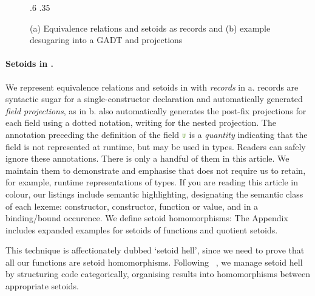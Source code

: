 \begin{figure}
\TwoColDIY%
    {.6}{\EquivalenceDef{}
          \SetoidDef{}}%
    {.35}{%
      \SetoidSugar{}
      \SetoidCarrierSugar{}
      \SetoidRelationSugar{}
    }
    \caption{(a) Equivalence relations and setoids as records and
      (b) example desugaring into a GADT and projections}
\end{figure}
\paragraph{Setoids in \idris{}.}
We represent equivalence
relations and setoids in \idris{} with \emph{records} in a.
\idris{} records are syntactic sugar for a single-constructor
 declaration and automatically generated
\emph{field projections}, as in b.  \idris{} also
automatically generates the post-fix projections for each
field using a dotted notation, writing
 for the
nested projection.
The annotation  preceding the definition of the field $\U$ is a
\emph{quantity} \cite{mcbride:qtt,atkey:qtt} indicating
that the field is not represented at runtime, but may be used in
types. Readers can safely ignore these annotations. There is only a handful of them in
this article.
We maintain them to demonstrate and emphasise that \Frexlib{} does not
require us to retain, for example, runtime representations of types.
If you are reading this article in colour,
our listings include semantic highlighting, designating the semantic class
of each lexeme:  constructor, 
constructor,  function or value, and
 in a binding/bound occurence.
We define setoid homomorphisms:
The Appendix includes expanded examples for setoids of functions and quotient
setoids.

This technique is affectionately dubbed `setoid hell', since we
need to prove that all our functions are setoid homomorphisms.
Following \citeauthor{hu-carette:agda-ct}~\citeyearpar{hu-carette:agda-ct}, we manage
setoid hell by structuring code categorically, organising results
into homomorphisms between appropriate setoids.
